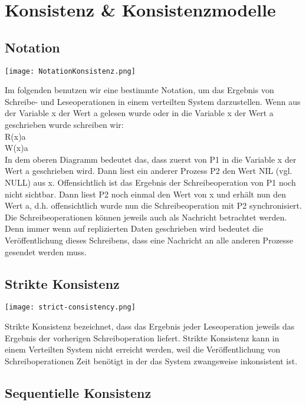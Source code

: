 \section{Konsistenz \& Konsistenzmodelle}

\subsection{Notation}

\texttt{[image: NotationKonsistenz.png]}

Im folgenden benutzen wir eine bestimmte Notation, um das Ergebnis von Schreibe- und Leseoperationen in einem verteilten System darzustellen. Wenn aus der Variable x der Wert a gelesen wurde oder in die Variable x der Wert a geschrieben wurde schreiben wir:\\

R(x)a \\
W(x)a \\

In dem oberen Diagramm bedeutet das, dass zuerst von P1 in die Variable x der Wert a geschrieben wird. Dann liest ein anderer Prozess P2 den Wert NIL (vgl. NULL) aus x. Offensichtlich ist das Ergebnis der Schreibeoperation von P1 noch nicht sichtbar. Dann liest P2 noch einmal den Wert von x und erhält nun den Wert a, d.h. offensichtlich wurde nun die Schreibeoperation mit P2 synchronisiert. Die Schreibeoperationen können jeweils auch als Nachricht betrachtet werden. Denn immer wenn auf replizierten Daten geschrieben wird bedeutet die Veröffentlichung dieses Schreibens, dass eine Nachricht an alle anderen Prozesse gesendet werden muss.

\subsection{Strikte Konsistenz}

\texttt{[image: strict-consistency.png]}

Strikte Konsistenz bezeichnet, dass das Ergebnis jeder Leseoperation jeweils das Ergebnis der vorherigen Schreiboperation liefert. Strikte Konsistenz kann in einem Verteilten System nicht erreicht werden, weil die Veröffentlichung von Schreiboperationen Zeit benötigt in der das System zwangsweise inkonsistent ist.

\subsection{Sequentielle Konsistenz}

